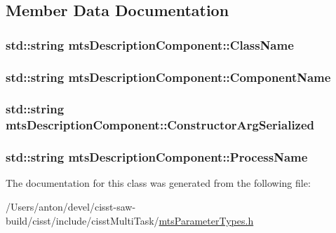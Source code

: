 \subsection{Member Data Documentation}
\hypertarget{classmts_description_component_a38a518bbf9ec10334313b6d558c7c774}{}
\subsubsection[{Class\+Name}]{\setlength{\rightskip}{0pt plus 5cm}std\+::string mts\+Description\+Component\+::\+Class\+Name}\label{classmts_description_component_a38a518bbf9ec10334313b6d558c7c774}
\hypertarget{classmts_description_component_ad8aaca842f71e592a1bd50c483cc1bad}{}
\subsubsection[{Component\+Name}]{\setlength{\rightskip}{0pt plus 5cm}std\+::string mts\+Description\+Component\+::\+Component\+Name}\label{classmts_description_component_ad8aaca842f71e592a1bd50c483cc1bad}
\hypertarget{classmts_description_component_a16a127a39f87ca4c87c1cd34b6393f6b}{}
\subsubsection[{Constructor\+Arg\+Serialized}]{\setlength{\rightskip}{0pt plus 5cm}std\+::string mts\+Description\+Component\+::\+Constructor\+Arg\+Serialized}\label{classmts_description_component_a16a127a39f87ca4c87c1cd34b6393f6b}
\hypertarget{classmts_description_component_a84c50616e9ae8b624261a21399d91395}{}
\subsubsection[{Process\+Name}]{\setlength{\rightskip}{0pt plus 5cm}std\+::string mts\+Description\+Component\+::\+Process\+Name}\label{classmts_description_component_a84c50616e9ae8b624261a21399d91395}


The documentation for this class was generated from the following file\+:\begin{DoxyCompactItemize}
\item 
/\+Users/anton/devel/cisst-\/saw-\/build/cisst/include/cisst\+Multi\+Task/\hyperlink{mts_parameter_types_8h}{mts\+Parameter\+Types.\+h}\end{DoxyCompactItemize}
